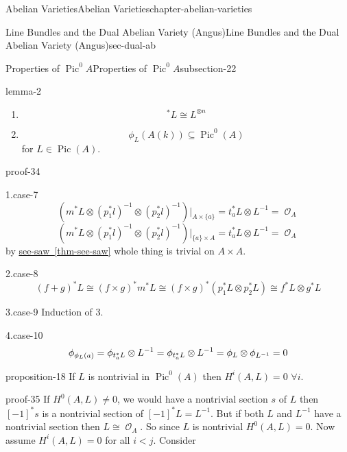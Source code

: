 \documentclass[oneside,10pt,]{book}
\renewcommand{\qedhere}{\relax}
\numberwithin{equation}{section}
\newcommand{\sheaf}[1]{\operatorname{\mathcal{#1}}}
\newcommand{\lb}{[}
\newcommand{\rb}{]}
\DeclareMathOperator{\Pic}{Pic}
\newcommand{\lt}{<}
\begin{document}
\begin{chapterptx}{Abelian Varieties}{}{Abelian Varieties}{}{}{chapter-abelian-varieties}
\begin{sectionptx}{Line Bundles and the Dual Abelian Variety (Angus)}{}{Line Bundles and the Dual Abelian Variety (Angus)}{}{}{sec-dual-ab}
\begin{subsectionptx}{Properties of \(\Pic^0 A\)}{}{Properties of \(\Pic^0 A\)}{}{}{subsection-22}
\begin{lemma}{}{}{lemma-2}
\begin{enumerate}
%
\item\hypertarget{li-31}{}%
\begin{equation*}
[n]^* L \cong L^{\otimes n}
\end{equation*}
%
\item\hypertarget{li-32}{}%
\begin{equation*}
\phi_L(A(k)) \subseteq \Pic^0(A)
\end{equation*}
for \(L \in \Pic (A)\).%
\end{enumerate}
%
\end{lemma}
\begin{proofptx}{}{proof-34}
\begin{case}
{}{1.}{case-7}
\hypertarget{p-180}{}%
%
\begin{equation*}
(m^*L\otimes (p_1^*l)^{-1} \otimes (p_2^*l)^{-1})|_{A\times\{a\}} = t_a^*L \otimes L^{-1} = \sheaf O_A
\end{equation*}
%
\begin{equation*}
(m^*L\otimes (p_1^*l)^{-1} \otimes (p_2^*l)^{-1})|_{\{a\}\times A} = t_a^*L \otimes L^{-1} = \sheaf O_A
\end{equation*}
by \hyperref[thm-see-saw]{see-saw~\ref{thm-see-saw}} whole thing is trivial on \(A\times A\).%
\end{case}
\begin{case}
{}{2.}{case-8}
\hypertarget{p-181}{}%
%
\begin{equation*}
(f+g)^*L\cong (f\times g)^* m^*L \cong (f\times g)^*(p_1^*L \otimes p_2^*L) \cong f^*L \otimes g^*L
\end{equation*}
%
\end{case}
\begin{case}
{}{3.}{case-9}
\hypertarget{p-182}{}%
Induction of 3.%
\end{case}
\begin{case}
{}{4.}{case-10}
\hypertarget{p-183}{}%
%
\begin{equation*}
\phi_{\phi_L(a)} = \phi_{t^*_a L}\otimes L^{-1} = \phi _{t_a^*L}\otimes L^{-1} = \phi_L \otimes \phi_{L^{-1}} = 0\qedhere
\end{equation*}
%
\end{case}
\end{proofptx}
\begin{proposition}{}{}{proposition-18}%
\hypertarget{p-184}{}%
If \(L\) is nontrivial in \(\Pic^0(A)\) then \(H^i(A,L) = 0\) \(\forall i\).%
\end{proposition}
\begin{proofptx}{}{proof-35}
\hypertarget{p-185}{}%
If \(H^0(A,L) \ne 0\), we would have  a nontrivial section \(s\) of \(L\) then \(\lb -1\rb ^* s\) is   a nontrivial section of \(\lb-1\rb^* L = L^{-1}\). But if both \(L\) and \(L^{-1}\) have  a nontrivial section then \(L \cong \sheaf O_A\). So since \(L\) is nontrivial \(H^0(A,L) = 0\). Now assume \(H^i(A,L) = 0\) for all \(i\lt j\). Consider%

\end{proofptx}
\end{subsectionptx}
\end{sectionptx}
\end{chapterptx}
\end{document}
